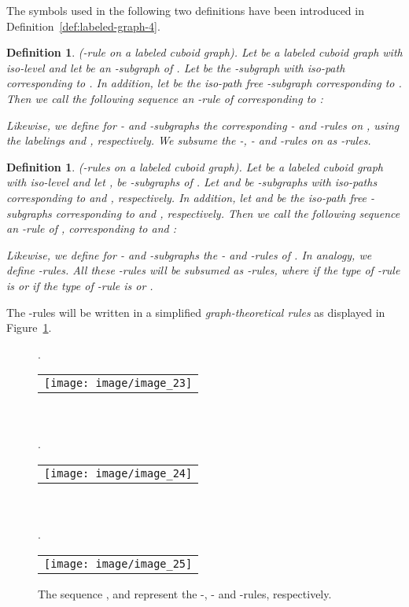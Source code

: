 \documentclass[a4paper,11pt]{article}
\newtheorem{definition}[theorem]{Definition}
\begin{document}
The symbols used in the following two definitions have been introduced in
Definition~\ref{def:labeled-graph-4}.
\begin{definition}(-rule on a labeled cuboid graph). Let  be a labeled cuboid
graph with iso-level  and let  be an -subgraph of .
Let  be the -subgraph with iso-path
corresponding to . In addition, let  
be the iso-path free -subgraph corresponding to . Then we call the following sequence an
-rule of  corresponding to :

Likewise, we define for  - and -subgraphs the corresponding - and -rules on ,
using the labelings  and , respectively.
We subsume the -, - and -rules on  as -rules.
\label{def:iso-path-20}
\end{definition}

\begin{definition}(-rules on a labeled cuboid graph). Let  be a labeled
cuboid graph with iso-level  and let ,
 be -subgraphs of .
Let  and
 be -subgraphs
with iso-paths corresponding to  and , respectively. In addition, let
 and
 be the iso-path free
-subgraphs corresponding to  and , respectively. Then we call the following sequence an
-rule of , corresponding to  and :

Likewise, we define for - and -subgraphs the - and -rules of . In analogy, we define
-rules. All these -rules will be subsumed as -rules, where  if the type of -rule
is  or  if the type of -rule is  or .
\label{def:iso-path-21}
\end{definition}
The -rules will be written in a simplified {\it graph-theoretical rules} as displayed in
Figure~\ref{image_23_24_25}.
\begin{figure}[!ht]
.
\begin{tabular}[c]{l}
\texttt{[image: image/image\_23]}
\end{tabular}\\ \\

.
\begin{tabular}[c]{l}
\texttt{[image: image/image\_24]}
\end{tabular}\\ \\

.
\begin{tabular}[c]{l}
\texttt{[image: image/image\_25]}
\end{tabular}
\caption{The sequence ,  and  represent the -, - and -rules, respectively.}
\label{image_23_24_25}
\end{figure}
\FloatBarrier
\end{document}
